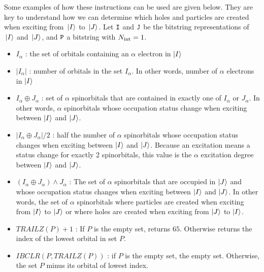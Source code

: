        
Some examples of how these instructions can be used are given below. They are key to understand how we can determine which holes and particles are created when exciting from ${\ket*{I}}$ to ${\ket*{J}}$.
Let ${\texttt{I}}$ and ${{\texttt{J}}}$ be the bitstring representations of ${\ket*{I}}$ and ${\ket*{J}}$, and ${\texttt{P}}$ a bitstring with ${N_\text{int}}=1$. 


      
      
\begin{itemize}
	      
	\item
		$I_{\alpha}$ : the set of orbitals containing an $\alpha$ electron in $\ket I$
	            
	\item
		$|I_{\alpha}|$ : number of orbitals in the set $I_{\alpha}$. In other words, number of $\alpha$ electrons in $\ket I$ 
	            
	\item
		$I_{\alpha} \oplus J_{\alpha}$ : set of $\alpha$ spinorbitals that are contained in exactly one of $I_{\alpha}$ or $J_{\alpha}$. In other words, $\alpha$ spinorbitals whose occupation status change when exciting between $\ket I$ and $\ket J$. 
	            
	\item
		$|I_{\alpha} \oplus J_{\alpha}|/2$ : half the number of $\alpha$ spinorbitals whose occupation status changes when exciting between $\ket I$ and $\ket J$. Because an excitation means a status change for exactly 2 spinorbitals, this value is the $\alpha$ excitation degree between $\ket I$ and $\ket J$.
	            
	\item
		$(I_{\alpha} \oplus J_{\alpha}) \wedge J_{\alpha}$ :
	      The set of $\alpha$ spinorbitals that are occupied in $\ket J$ and whose occupation status changes when exciting between $\ket I$ and $\ket J$. In other words, the set of $\alpha$ spinorbitals where particles are created when exciting from $\ket I$ to $\ket J$ or where holes are created when exciting from $\ket J$ to $\ket I$.
	            
	\item
		$TRAILZ(P)+1$ :
	      If $P$ is the empty set, returns $65$. Otherwise returns the index of the lowest orbital in set $P$.
	            
	\item
		$IBCLR(P,TRAILZ(P))$ :
	      if $P$ is the empty set, the empty set. Otherwise, the set $P$ minus its orbital of lowest index.
\end{itemize}


